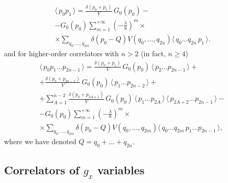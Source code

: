\documentclass[12pt]{article}
\newcommand{\lr}[1]{ \left( #1 \right) }
\newcommand{\vev}[1]{ \langle \, #1 \, \rangle }
\begin{document}
\begin{eqnarray}
\label{sd_eqs_G2_mom_vertex_alg}
 \vev{p_0 p_1} = \frac{\delta\lr{p_0 + p_1}}{V} \, G_0\lr{p_0}
 - \nonumber \\ -
 G_0\lr{p_0} \sum\limits_{m=1}^{+\infty}
 \lr{-\frac{\lambda}{8}}^m
 \times \nonumber \\ \times
 \sum\limits_{q_0, \ldots, q_{2 m}}
 \delta\lr{p_0 - Q}
 V\lr{q_0, \ldots, q_{2 n}}
 \vev{q_0 \ldots q_{2 n} \, p_1} .
\end{eqnarray}
and for higher-order correlators with $n > 2$ (in fact, $n \geq 4$)
\begin{eqnarray}
\label{sd_eqs_Gn_mom_vertex_alg}
 \vev{p_0 p_1 \ldots p_{2n-1}}
 =
 \frac{\delta\lr{p_0 + p_1}}{V} \, G_0\lr{p_0} \, \vev{p_2 \ldots p_{2n-1}}
 + \nonumber \\ +
 \frac{\delta\lr{p_0 + p_{2n-1}}}{V} \, G_0\lr{p_0} \, \vev{p_1 \ldots p_{2n-2}}
 + \nonumber \\ +
 \sum\limits_{A=1}^{n-2}
 \frac{\delta\lr{p_0 + p_{2A+1}}}{V} \, G_0\lr{p_0} \,
 \vev{p_1 \ldots p_{2A}} \, \vev{p_{2 A+2} \ldots p_{2n-1}}
 - \nonumber \\ -
 G_0\lr{p_0} \sum\limits_{m=1}^{+\infty}
 \lr{-\frac{\lambda}{8}}^m
 \times \nonumber \\ \times
 \sum\limits_{q_0, \ldots, q_{2 m}}
 \delta\lr{p_0 - Q}
 V\lr{q_0, \ldots, q_{2 m}}
 \vev{q_0 \ldots q_{2 m} \, p_1  \ldots p_{2n-1}} ,
\end{eqnarray}
where we have denoted $Q = q_0 + \ldots + q_{2 n}$.


\subsection{Correlators of $g_x$ variables}
\label{subsec:gx_correlators}
\end{document}
